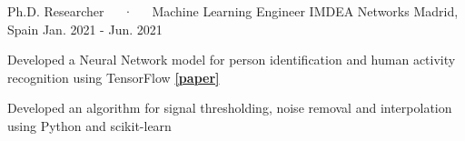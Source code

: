 \begin{cventries}
  \cventry
    {Ph.D. Researcher~~~·~~~Machine Learning Engineer} %
    {IMDEA Networks} %
    {Madrid, Spain} %
    {Jan. 2021 - Jun. 2021} %
    {
      \begin{cvitems} %
        \item {Developed a Neural Network model for person identification and human activity recognition using TensorFlow \href{https://ieeexplore.ieee.org/abstract/document/10172159/}{\textbf{[paper]}}}
        \item {Developed an algorithm for signal thresholding, noise removal and interpolation using Python and scikit-learn}
      \end{cvitems}
    }



\end{cventries}
